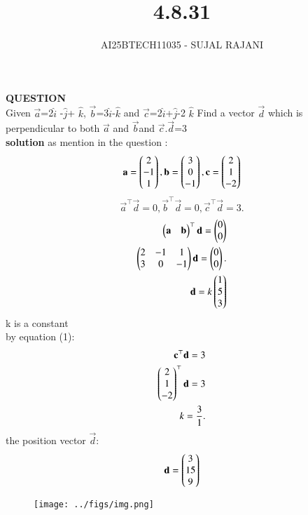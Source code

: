\documentclass[journal,12pt,onecolumn]{IEEEtran}
\begin{document}
\title{4.8.31}
\author{AI25BTECH11035 - SUJAL RAJANI}
{\let\newpage\relax\maketitle}
\textbf{QUESTION}
\\
    Given $\vec{a}$=2$\hat{i}$ -$\hat{j}$+ $\hat{k}$, $\vec{b}$=3$\hat{i}$-$\hat{k}$ and $\vec{c}$=2$\hat{i}$+$\hat{j}$-2 $\hat{k}$ Find a vector  $\vec{d}$ which is perpendicular to both $\vec{a}$ and $\vec{b}$and $\vec{c}$.$\vec{d}$=3
\\
\textbf{solution}
as mention in the question :
\begin{align*}
    \mathbf{a}=\begin{pmatrix}2\\-1\\1\end{pmatrix},\mathbf{b}=\begin{pmatrix}3\\0\\-1\end{pmatrix},\mathbf{c}=\begin{pmatrix}2\\1\\-2\end{pmatrix}
\end{align*}
\begin{equation}
    \vec{a}^\top\vec{d}=0, \vec{b}^\top\vec{d}=0,  \vec{c}^\top\vec{d}=3.
\end{equation}
\begin{align*}
    \begin{pmatrix}\mathbf{a}&\mathbf{b}\end{pmatrix}^\top\mathbf{d}=\begin{pmatrix}0\\0\end{pmatrix}
    \\
    \begin{pmatrix}2&-1&1\\3&0&-1\end{pmatrix}\mathbf{d}=\begin{pmatrix}0\\0\end{pmatrix}.
    \\
    \mathbf{d}=k\begin{pmatrix}1\\5\\3\end{pmatrix}
\end{align*}
k is a constant 
\\
by equation (1):
\begin{align*}
\mathbf{c}^\top\mathbf{d}=3
\\
    \begin{pmatrix}2\\1\\-2\end{pmatrix}^\top\mathbf{d}=3
    \\
    k=\dfrac{3}{1}.
\end{align*}
the position vector $\vec{d}$:
\begin{align*}
    \mathbf{d}=\begin{pmatrix}3\\15\\9\end{pmatrix}
\end{align*}

        \begin{figure}[H]
    \centering
\texttt{[image: ../figs/img.png]}
    \caption*{}
    \label{figs}
\end{figure}
\end{document}
